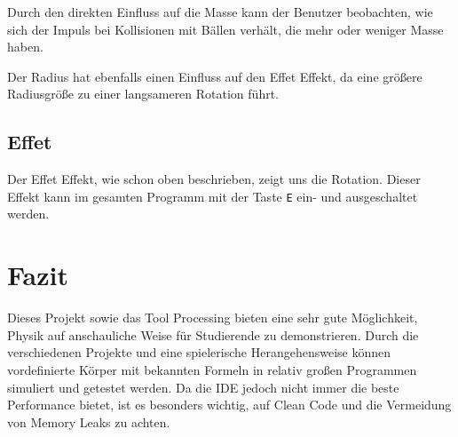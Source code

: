 \documentclass[12pt,a4paper]{article}
\begin{document}
Durch den direkten Einfluss auf die Masse kann der Benutzer beobachten, wie sich der Impuls bei Kollisionen mit Bällen verhält, die mehr oder weniger Masse haben.  

Der Radius hat ebenfalls einen Einfluss auf den Effet Effekt, da eine größere Radiusgröße zu einer langsameren Rotation führt.

	
	
	\subsection{Effet}
	
	Der Effet Effekt, wie schon oben beschrieben, zeigt uns die Rotation. Dieser Effekt kann im gesamten Programm mit der Taste \texttt{E} ein- und ausgeschaltet werden.
	
	\section{Fazit}
	
Dieses Projekt sowie das Tool Processing bieten eine sehr gute Möglichkeit, Physik auf anschauliche Weise für Studierende zu demonstrieren. Durch die verschiedenen Projekte und eine spielerische Herangehensweise können vordefinierte Körper mit bekannten Formeln in relativ großen Programmen simuliert und getestet werden. Da die IDE jedoch nicht immer die beste Performance bietet, ist es besonders wichtig, auf Clean Code und die Vermeidung von Memory Leaks zu achten.
	
	
	
\end{document}
